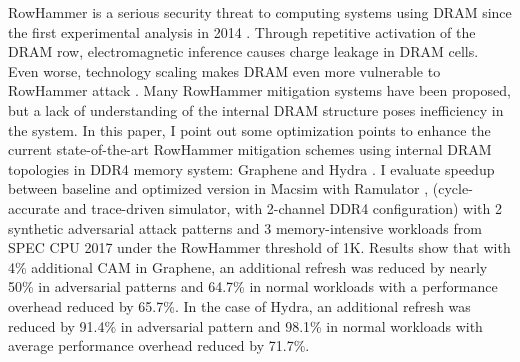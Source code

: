 \begin{EnglishAbstract}
  RowHammer is a serious security threat to computing systems using DRAM since the first 
  experimental analysis in 2014 \cite{FlippingBits}. Through repetitive activation of the DRAM row, 
  electromagnetic inference causes charge leakage in DRAM cells. Even worse, technology scaling 
  makes DRAM even more vulnerable to RowHammer attack \cite{Revisiting}. 
  Many RowHammer mitigation systems have been proposed, but a lack of understanding of the internal DRAM structure 
  poses inefficiency in the system.
  In this paper, I point out some optimization points to enhance the 
  current state-of-the-art RowHammer mitigation schemes using internal DRAM topologies in DDR4 memory system: 
  Graphene \cite{Graphene} and Hydra \cite{Hydra}. I evaluate speedup between baseline and optimized 
  version in Macsim with Ramulator \cite{MACSIM}, \cite{RAMULATOR} (cycle-accurate and trace-driven 
  simulator, with 2-channel DDR4 configuration) with 2 synthetic adversarial attack patterns and 3 
  memory-intensive workloads from SPEC CPU 2017 under the RowHammer threshold of 1K. 
  Results show that with 4\% additional CAM in Graphene, an additional refresh was reduced by 
  nearly 50\% in adversarial patterns and 64.7\% in normal workloads with a performance overhead reduced by 65.7\%. 
  In the case of Hydra, an additional refresh was reduced by 91.4\% in adversarial pattern and 98.1\% in normal workloads 
  with average performance overhead reduced by 71.7\%. 
\end{EnglishAbstract}
